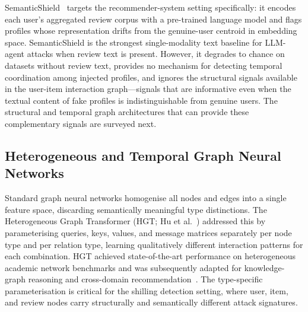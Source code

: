 SemanticShield~\cite{li2025semanticshield} targets the recommender-system setting
specifically: it encodes each user's aggregated review corpus with a pre-trained
language model and flags profiles whose representation drifts from the
genuine-user centroid in embedding space.
SemanticShield is the strongest single-modality text baseline for LLM-agent
attacks when review text is present.
However, it degrades to chance on datasets without review text, provides no
mechanism for detecting temporal coordination among injected profiles, and
ignores the structural signals available in the user-item interaction
graph—signals that are informative even when the textual content of fake
profiles is indistinguishable from genuine users.
The structural and temporal graph architectures that can provide these
complementary signals are surveyed next.

\subsection{Heterogeneous and Temporal Graph Neural Networks}
\label{sec:rel_gnn}

Standard graph neural networks homogenise all nodes and edges into a single
feature space, discarding semantically meaningful type distinctions.
The Heterogeneous Graph Transformer (HGT; Hu et al.~\cite{hu2020hgt}) addressed
this by parameterising queries, keys, values, and message matrices separately
per node type and per relation type, learning qualitatively different
interaction patterns for each combination.
HGT achieved state-of-the-art performance on heterogeneous academic network
benchmarks and was subsequently adapted for knowledge-graph reasoning and
cross-domain recommendation~\cite{lv2021we}.
The type-specific parameterisation is critical for the shilling detection
setting, where user, item, and review nodes carry structurally and semantically
different attack signatures.

